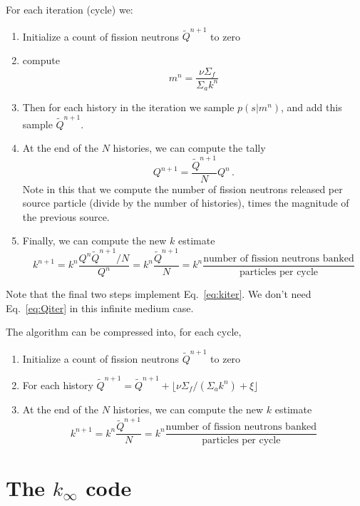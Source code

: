 \documentclass[12pt]{article}
\begin{document}
For each iteration (cycle) we:
\begin{enumerate}
\item Initialize a count of fission neutrons $\tilde Q^{n+1}$ to zero
\item compute 
\begin{equation}
m^n = \frac{\nu \Sigma_f}{\Sigma_a k^n}
\end{equation}
\item Then for each history in the iteration we 
sample $p(s|m^n)$, and add this sample $\tilde Q^{n+1}$.  
\item At the end of the $N$ histories, we can compute the tally
\begin{equation}
Q^{n+1} = \frac{\tilde Q^{n+1}}{N} Q^n \,.
\end{equation}
Note in this that we compute the number of fission neutrons released per source particle (divide by the number of histories), times the magnitude of the previous source.  
\item Finally, we can compute the new $k$ estimate
\begin{equation}
k^{n+1} = k^n \frac{Q^n \tilde Q^{n+1}/N}{Q^{n}} = k^n \frac{\tilde Q^{n+1}}{N} = k^n \frac{\text{number of fission neutrons banked}}{\text{particles per cycle}}
\end{equation}

\end{enumerate}

Note that the final two steps implement Eq.~\ref{eq:kiter}. We don't need Eq.~\ref{eq:Qiter} in this infinite medium case.

The algorithm can be compressed into, for each cycle,
\begin{enumerate}
\item Initialize a count of fission neutrons $\tilde Q^{n+1}$ to zero
\item For each history $\tilde Q^{n+1} = \tilde Q^{n+1} + \bigl\lfloor \nu \Sigma_f/({\Sigma_a k^n}) + \xi \bigr\rfloor$ 
\item At the end of the $N$ histories, we can compute the new $k$ estimate
\begin{equation}
k^{n+1} = k^n \frac{\tilde Q^{n+1}}{N} = k^n \frac{\text{number of fission neutrons banked}}{\text{particles per cycle}}
\end{equation}

\end{enumerate}


\section{The $k_\infty$ code}
\end{document}
